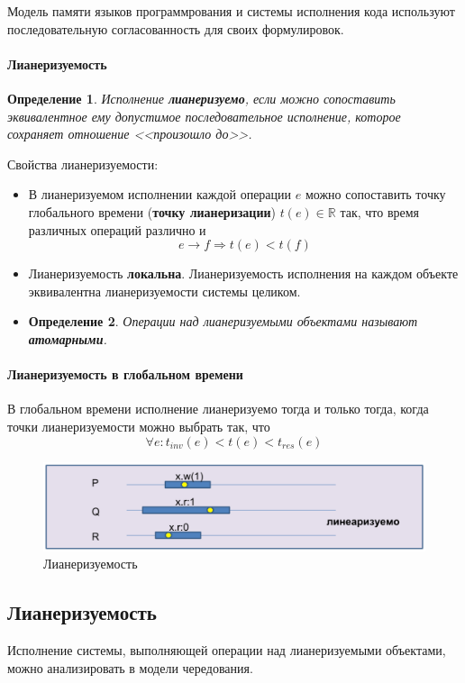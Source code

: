 \documentclass[10pt,a4paper,oneside,titlepage]{article}
\theoremstyle{plain}
\theoremstyle{defenition}
\newtheorem*{defenition}{Определение}
\begin{document}
Модель памяти языков программрования и системы исполнения кода используют последовательную согласованность для своих формулировок.

\paragraph{Лианеризуемость}
\begin{defenition}
	Исполнение {\bfseries лианеризуемо}, если можно сопоставить эквивалентное ему допустимое последовательное исполнение, которое сохраняет отношение <<произошло до>>. 
\end{defenition}

Свойства лианеризуемости:
\begin{itemize}
	\item В лианеризуемом исполнении каждой операции $e$ можно сопоставить точку глобального времени ({\bfseries точку лианеризации}) $t(e)\in\mathbb{R}$ так, что время различных операций различно и
	$$
	e\to f\Rightarrow t(e)<t(f)
	$$
	\item Лианеризуемость {\bfseries локальна}. Лианеризуемость исполнения на каждом объекте эквивалентна лианеризуемости системы целиком.
	\item \begin{defenition}
		Операции над лианеризуемыми объектами называют {\bfseries атомарными}.
	\end{defenition}
\end{itemize}

\paragraph{Лианеризуемость в глобальном времени}

В глобальном времени исполнение лианеризуемо тогда и только тогда, когда точки лианеризуемости можно выбрать так, что
$$
\forall e\colon t_{inv}(e)<t(e)<t_{res}(e)
$$

\begin{figure}[h!]
	\centering
	\includegraphics[width=0.5\linewidth]{pictures/Model11}
	\caption{Лианеризуемость}
	\label{fig:model11}
\end{figure}

\subsection{Лианеризуемость}
Исполнение системы, выполняющей операции над лианеризуемыми объектами, можно анализировать в модели чередования.
\end{document}
